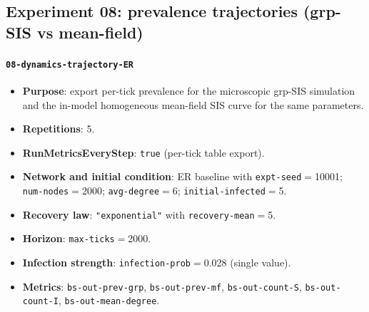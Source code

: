 \documentclass[11pt,a4paper]{article}
\begin{document}
\subsection{Experiment 08: prevalence trajectories (grp-SIS vs mean-field)}
\paragraph{\texttt{08-dynamics-trajectory-ER}}
\begin{itemize}[leftmargin=*]
  \item \textbf{Purpose}: export per-tick prevalence for the microscopic grp-SIS simulation and the in-model homogeneous mean-field SIS curve for the same parameters.
  \item \textbf{Repetitions}: 5.
  \item \textbf{RunMetricsEveryStep}: \texttt{true} (per-tick table export).
  \item \textbf{Network and initial condition}: ER baseline with \texttt{expt-seed}$=$10001; \texttt{num-nodes}$=$2000; \texttt{avg-degree}$=$6; \texttt{initial-infected}$=$5.
  \item \textbf{Recovery law}: \texttt{"exponential"} with \texttt{recovery-mean}$=$5.
  \item \textbf{Horizon}: \texttt{max-ticks}$=$2000.
  \item \textbf{Infection strength}: \texttt{infection-prob}$=$0.028 (single value).
  \item \textbf{Metrics}: \texttt{bs-out-prev-grp}, \texttt{bs-out-prev-mf}, \texttt{bs-out-count-S}, \texttt{bs-out-count-I}, \texttt{bs-out-mean-degree}.
\end{itemize}
\end{document}

